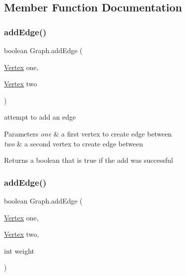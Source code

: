 \subsection{Member Function Documentation}
\mbox{\label{class_graph_a50d13043a91c83bfd9d89a4ba24de12b}} 
\subsubsection{\texorpdfstring{add\+Edge()}{addEdge()}\hspace{0.1cm}{\footnotesize\ttfamily [1/2]}}
{\footnotesize\ttfamily boolean Graph.\+add\+Edge (\begin{DoxyParamCaption}\item[{\hyperlink{class_vertex}{Vertex}}]{one,  }\item[{\hyperlink{class_vertex}{Vertex}}]{two }\end{DoxyParamCaption})}



attempt to add an edge 


\begin{DoxyParams}{Parameters}
{\em one} & a first vertex to create edge between \\
\hline
{\em two} & a second vertex to create edge between \\
\hline
\end{DoxyParams}
\begin{DoxyReturn}{Returns}
a boolean that is true if the add was successful 
\end{DoxyReturn}
\mbox{\label{class_graph_a7f18a8cf5f6fcf5c391fd02e15c7f46c}} 
\subsubsection{\texorpdfstring{add\+Edge()}{addEdge()}\hspace{0.1cm}{\footnotesize\ttfamily [2/2]}}
{\footnotesize\ttfamily boolean Graph.\+add\+Edge (\begin{DoxyParamCaption}\item[{\hyperlink{class_vertex}{Vertex}}]{one,  }\item[{\hyperlink{class_vertex}{Vertex}}]{two,  }\item[{int}]{weight }\end{DoxyParamCaption})}



